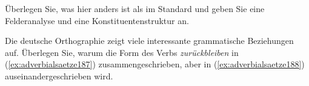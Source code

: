 \begin{exe}
\end{exe}

Überlegen Sie, was hier anders ist als im Standard und geben Sie eine Felderanalyse und eine Konstituentenstruktur an.

 \label{exc:saetze07} Die deutsche Orthographie zeigt viele interessante grammatische Beziehungen auf.
Überlegen Sie, warum die Form des Verbs \textit{zurückbleiben} in (\ref{ex:adverbialsaetze187}) zusammengeschrieben, aber in (\ref{ex:adverbialsaetze188}) auseinandergeschrieben wird.

\begin{exe}
  \ex\label{ex:adverbialsaetze186}
  \begin{xlist}
  \end{xlist}
\end{exe}

